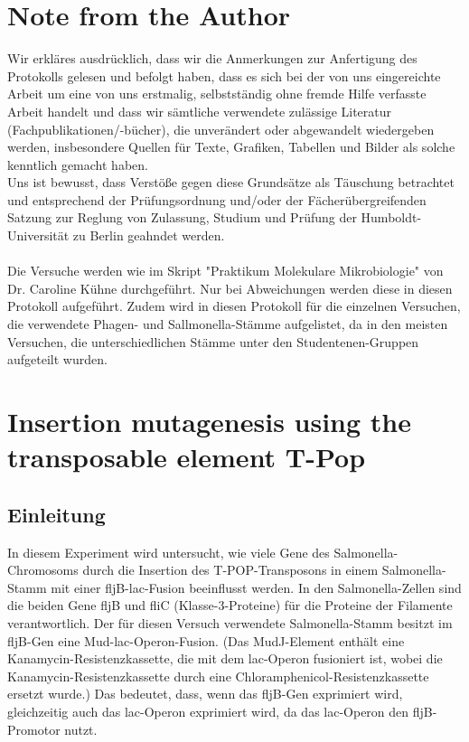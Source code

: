 \documentclass[oneside,10pt,a4paper]{report}
\begin{document}
	
	\tableofcontents
	\chapter{Note from the Author}
	Wir erkläres ausdrücklich, dass wir die Anmerkungen zur Anfertigung des Protokolls gelesen und befolgt haben, dass es sich bei der von uns eingereichte Arbeit um eine von uns erstmalig, selbstständig ohne fremde Hilfe verfasste Arbeit handelt und dass wir sämtliche verwendete zulässige Literatur (Fachpublikationen/-bücher), die unverändert oder abgewandelt wiedergeben werden, insbesondere Quellen für Texte, Grafiken, Tabellen und Bilder als solche kenntlich gemacht haben.\\
	Uns ist bewusst, dass Verstöße gegen diese Grundsätze als Täuschung betrachtet und entsprechend der Prüfungsordnung und/oder der Fächerübergreifenden Satzung zur Reglung von Zulassung, Studium und Prüfung der Humboldt-Universität zu Berlin geahndet werden.
	\\
	\\
	Die Versuche werden wie im Skript "Praktikum Molekulare Mikrobiologie" von Dr. Caroline Kühne \cite{Mibi-Script} durchgeführt. Nur bei Abweichungen werden diese in diesen Protokoll aufgeführt. Zudem wird in diesen Protokoll für die einzelnen Versuchen, die verwendete Phagen- und Sallmonella-Stämme aufgelistet, da in den meisten Versuchen, die unterschiedlichen Stämme unter den Studentenen-Gruppen aufgeteilt wurden.
	
	
	
	
	
	\chapter{Insertion mutagenesis using the transposable element T-Pop}	
	
		\section{Einleitung}
		In diesem Experiment wird untersucht, wie viele Gene des Salmonella-Chromosoms durch die Insertion des T-POP-Transposons in einem Salmonella-Stamm mit einer fljB-lac-Fusion beeinflusst werden.
		In den Salmonella-Zellen sind die beiden Gene fljB und fliC (Klasse-3-Proteine) für die Proteine der Filamente verantwortlich\cite{Flagellum}.
		 Der für diesen Versuch verwendete Salmonella-Stamm besitzt im fljB-Gen eine Mud-lac-Operon-Fusion. (Das MudJ-Element enthält eine Kanamycin-Resistenzkassette, die mit dem lac-Operon fusioniert ist, wobei die Kanamycin-Resistenzkassette durch eine Chloramphenicol-Resistenzkassette ersetzt wurde.)
		 Das bedeutet, dass, wenn das fljB-Gen exprimiert wird, gleichzeitig auch das lac-Operon exprimiert wird, da das lac-Operon den fljB-Promotor nutzt.
		
\end{document}
